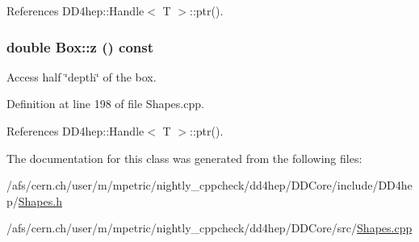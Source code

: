 References DD4hep::Handle$<$ T $>$::ptr().\hypertarget{class_d_d4hep_1_1_geometry_1_1_box_a6fa4743099a63dcd03f200aafee7253e}{
\subsubsection[{z}]{\setlength{\rightskip}{0pt plus 5cm}double Box::z () const}}
\label{class_d_d4hep_1_1_geometry_1_1_box_a6fa4743099a63dcd03f200aafee7253e}


Access half \char`\"{}depth\char`\"{} of the box. 

Definition at line 198 of file Shapes.cpp.

References DD4hep::Handle$<$ T $>$::ptr().

The documentation for this class was generated from the following files:\begin{DoxyCompactItemize}
\item 
/afs/cern.ch/user/m/mpetric/nightly\_\-cppcheck/dd4hep/DDCore/include/DD4hep/\hyperlink{_shapes_8h}{Shapes.h}\item 
/afs/cern.ch/user/m/mpetric/nightly\_\-cppcheck/dd4hep/DDCore/src/\hyperlink{_shapes_8cpp}{Shapes.cpp}\end{DoxyCompactItemize}
